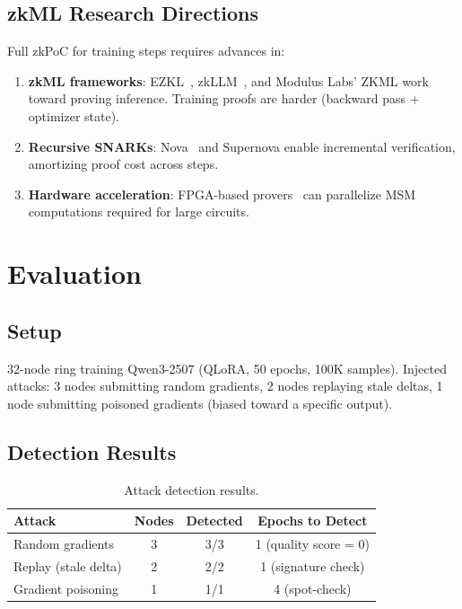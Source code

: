\documentclass[11pt,letterpaper]{article}
\begin{document}
\subsection{zkML Research Directions}

Full zkPoC for training steps requires advances in:
\begin{enumerate}
    \item \textbf{zkML frameworks}: EZKL~\cite{ezkl2023}, zkLLM~\cite{sun2024zkllm}, and Modulus Labs' ZKML work toward proving inference.  Training proofs are harder (backward pass + optimizer state).
    \item \textbf{Recursive SNARKs}: Nova~\cite{kothapalli2022nova} and Supernova enable incremental verification, amortizing proof cost across steps.
    \item \textbf{Hardware acceleration}: FPGA-based provers~\cite{zhang2023pipezk} can parallelize MSM computations required for large circuits.
\end{enumerate}

\section{Evaluation}
\label{sec:evaluation}

\subsection{Setup}

32-node ring training Qwen3-2507 (QLoRA, 50 epochs, 100K samples).  Injected attacks: 3 nodes submitting random gradients, 2 nodes replaying stale deltas, 1 node submitting poisoned gradients (biased toward a specific output).

\subsection{Detection Results}

\begin{table}[t]
\centering
\begin{tabular}{lccc}
\toprule
\textbf{Attack} & \textbf{Nodes} & \textbf{Detected} & \textbf{Epochs to Detect} \\
\midrule
Random gradients & 3 & 3/3 & 1 (quality score = 0) \\
Replay (stale delta) & 2 & 2/2 & 1 (signature check) \\
Gradient poisoning & 1 & 1/1 & 4 (spot-check) \\
\bottomrule
\end{tabular}
\caption{Attack detection results.}
\label{tab:detection}
\end{table}
\end{document}
